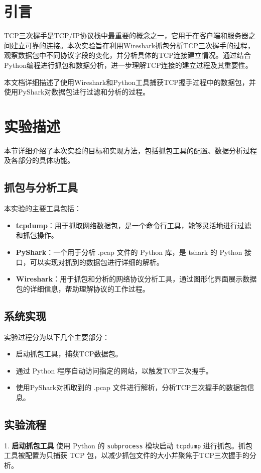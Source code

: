 \documentclass[12pt]{article}
\begin{document}


\section{引言}
TCP三次握手是TCP/IP协议栈中最重要的概念之一，它用于在客户端和服务器之间建立可靠的连接。本次实验旨在利用Wireshark抓包分析TCP三次握手的过程，观察数据包中不同协议字段的变化，并分析具体的TCP连接建立情况。通过结合Python编程进行抓包和数据分析，进一步理解TCP连接的建立过程及其重要性。

本文档详细描述了使用Wireshark和Python工具捕获TCP握手过程中的数据包，并使用PyShark对数据包进行过滤和分析的过程。

\section{实验描述}
本节详细介绍了本次实验的目标和实现方法，包括抓包工具的配置、数据分析过程及各部分的具体功能。

\subsection{抓包与分析工具}
本实验的主要工具包括：
\begin{itemize}
    \item \textbf{tcpdump}：用于抓取网络数据包，是一个命令行工具，能够灵活地进行过滤和抓包操作。
    \item \textbf{PyShark}：一个用于分析 .pcap 文件的 Python 库，是 tshark 的 Python 接口，可以实现对抓到的数据包进行详细的解析。
    \item \textbf{Wireshark}：用于抓包和分析的网络协议分析工具，通过图形化界面展示数据包的详细信息，帮助理解协议的工作过程。
\end{itemize}

\subsection{系统实现}
实验过程分为以下几个主要部分：

\begin{itemize}
    \item 启动抓包工具，捕获TCP数据包。
    \item 通过 Python 程序自动访问指定的网站，以触发TCP三次握手。
    \item 使用PyShark对抓取到的 .pcap 文件进行解析，分析TCP三次握手的数据包信息。
\end{itemize}

\subsection{实验流程}
1. \textbf{启动抓包工具}\newline
使用 Python 的 \texttt{subprocess} 模块启动 \texttt{tcpdump} 进行抓包。抓包工具被配置为只捕获 TCP 包，以减少抓包文件的大小并聚焦于TCP三次握手的分析。
\end{document}
